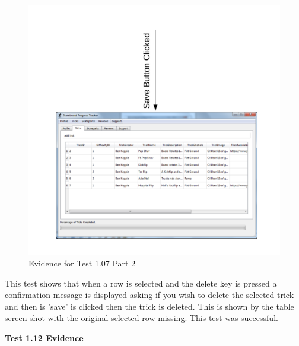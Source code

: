 \begin{figure}[H]
    \includegraphics[width=\textwidth]{./Testing/AnnotatedSamples/Test107p2.pdf}
    \caption{Evidence for Test 1.07 Part 2 } \label{fig:Test 1.07 p2}
\end{figure}

This test shows that when a row is selected and the delete key is pressed a confirmation message is displayed asking if you wish to delete the selected trick and then is 'save' is clicked then the trick is deleted. This is shown by the table screen shot with the original selected row missing. This test was successful.

\textbf{Test 1.12 Evidence}

